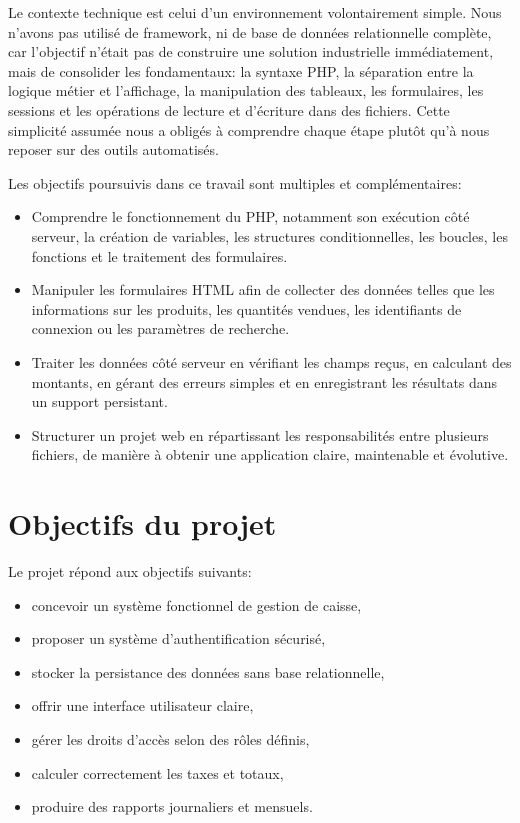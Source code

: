 \documentclass[12pt,a4paper]{article}
\begin{document}
Le contexte technique est celui d'un environnement volontairement simple. Nous n'avons pas utilisé de framework, ni de base de données relationnelle complète, car l'objectif n'était pas de construire une solution industrielle immédiatement, mais de consolider les fondamentaux: la syntaxe PHP, la séparation entre la logique métier et l'affichage, la manipulation des tableaux, les formulaires, les sessions et les opérations de lecture et d'écriture dans des fichiers. Cette simplicité assumée nous a obligés à comprendre chaque étape plutôt qu'à nous reposer sur des outils automatisés.

Les objectifs poursuivis dans ce travail sont multiples et complémentaires:
\begin{itemize}
\item Comprendre le fonctionnement du PHP, notamment son exécution côté serveur, la création de variables, les structures conditionnelles, les boucles, les fonctions et le traitement des formulaires.
\item Manipuler les formulaires HTML afin de collecter des données telles que les informations sur les produits, les quantités vendues, les identifiants de connexion ou les paramètres de recherche.
\item Traiter les données côté serveur en vérifiant les champs reçus, en calculant des montants, en gérant des erreurs simples et en enregistrant les résultats dans un support persistant.
\item Structurer un projet web en répartissant les responsabilités entre plusieurs fichiers, de manière à obtenir une application claire, maintenable et évolutive.
\end{itemize}


\section{Objectifs du projet}
Le projet répond aux objectifs suivants:
\begin{itemize}
  \item concevoir un système fonctionnel de gestion de caisse,
  \item proposer un système d'authentification sécurisé,
  \item stocker la persistance des données sans base relationnelle,
  \item offrir une interface utilisateur claire,
  \item gérer les droits d'accès selon des rôles définis,
  \item calculer correctement les taxes et totaux,
  \item produire des rapports journaliers et mensuels.
\end{itemize}
\end{document}
